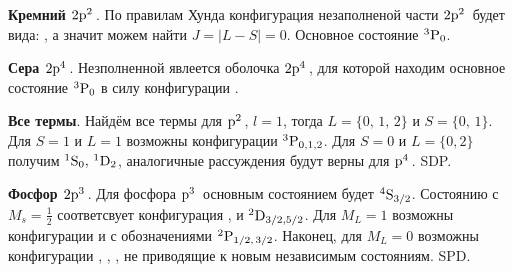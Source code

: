 
\textbf{Кремний $2\textnormal{p}^{2}\,$}. По правилам Хунда конфигурация незаполненой части $2\textnormal{p}^{2}\,$ будет вида: , а значит можем найти $J = |L-S| = 0$. Основное состояние ${}^{3}\textnormal{P}_{0}$.

\textbf{Сера  $2\textnormal{p}^{4}\,$}. Незполненной явлеется оболочка $2\textnormal{p}^{4}\,$, для которой находим основное состояние ${}^{3}\textnormal{P}_{0}$ в силу конфигурации .

\textbf{Все термы}. 
 Найдём все термы для $\textnormal{p}^{2}\,$, $l=1$, тогда $L = \{0,\, 1,\, 2\}$ и $S = \{0,\, 1\}$. 
Для $S=1$ и $L=1$ возможны конфигурации ${}^{3}\textnormal{P}_{0, 1, 2}$. Для $S = 0$ и $L=\{0,2\}$ получим ${}^{1}\textnormal{S}_{0},\, {}^{1}\textnormal{D}_{2}$, аналогичные рассуждения будут верны для $\textnormal{p}^{4}\,$. SDP.

\textbf{Фосфор  $2\textnormal{p}^{3}\,$}. 
Для фосфора $\textnormal{p}^{3}\,$ основным состоянием будет ${}^{4}\textnormal{S}_{3/2}$. Состоянию с $M_s = \frac{1}{2}$ соответсвует конфигурация , и ${}^{2}\textnormal{D}_{3/2, 5/2}$. Для $M_L = 1$ возможны конфигурации  и  с обозначениями ${}^{2}\textnormal{P}_{1/2,\, 3/2}$. Наконец, для $M_L = 0$ возможны конфигурации , , , не приводящие к новым независимым состояниям. SPD.

